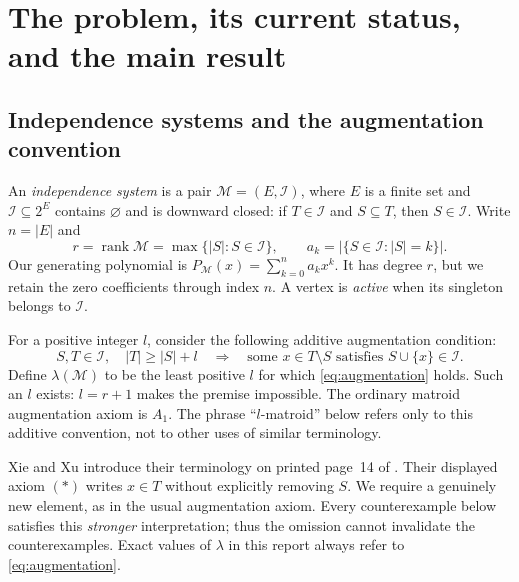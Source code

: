 \documentclass[11pt,letterpaper]{article}
\numberwithin{equation}{section}
\theoremstyle{definition}
\theoremstyle{remark}
\newcommand{\I}{\mathcal I}
\newcommand{\M}{\mathcal M}
\newcommand{\rank}{\operatorname{rank}}
\begin{document}
\tableofcontents
\newpage

\section{The problem, its current status, and the main result}
\label{sec:problem}

\subsection{Independence systems and the augmentation convention}
An \emph{independence system} is a pair $\M=(E,\I)$, where $E$ is a finite
set and $\I\subseteq2^E$ contains $\varnothing$ and is downward closed:
if $T\in\I$ and $S\subseteq T$, then $S\in\I$.
Write $n=|E|$ and
\[
 r=\rank\M=\max\{|S|:S\in\I\},\qquad
 a_k=|\{S\in\I:|S|=k\}|.
\]
Our generating polynomial is $P_\M(x)=\sum_{k=0}^n a_kx^k$.
It has degree $r$, but we retain the zero coefficients through index $n$.
A vertex is \emph{active} when its singleton belongs to $\I$.

For a positive integer $l$, consider the following additive augmentation
condition:
\begin{equation}
\label{eq:augmentation}
 S,T\in\I,\quad |T|\ge |S|+l
 \quad\Longrightarrow\quad
 \text{some }x\in T\setminus S\text{ satisfies }S\cup\{x\}\in\I.
 \tag{$A_l$}
\end{equation}
Define $\lambda(\M)$ to be the least positive $l$ for which
\eqref{eq:augmentation} holds. Such an $l$ exists: $l=r+1$ makes the premise
impossible. The ordinary matroid augmentation axiom is $A_1$.
The phrase ``$l$-matroid'' below refers only to this additive convention,
not to other uses of similar terminology.

Xie and Xu introduce their terminology on printed page~14 of
\cite{XieXu}. Their displayed axiom $(*)$ writes $x\in T$ without explicitly
removing $S$. We require a genuinely new element, as in the usual
augmentation axiom. Every counterexample below satisfies this
\emph{stronger} interpretation; thus the omission cannot invalidate the
counterexamples. Exact values of $\lambda$ in this report always refer to
\eqref{eq:augmentation}.
\end{document}
